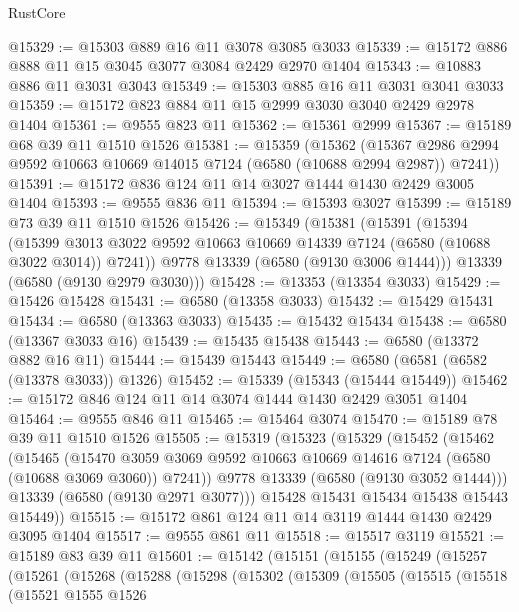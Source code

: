 \begin{lexlean}{RustCore}
\begin{coremodule}
{\begin{coremodule}
{{{{{{{{{{{{{{{{{{{{{{{{{{{{{{{{{{{{{{{{{{{{{@15329 := @15303 @889 @16 @11 @3078 @3085 @3033
@15339 := @15172 @886 @888 @11 @15 @3045 @3077 @3084 @2429 @2970 @1404
@15343 := @10883 @886 @11 @3031 @3043
@15349 := @15303 @885 @16 @11 @3031 @3041 @3033
@15359 := @15172 @823 @884 @11 @15 @2999 @3030 @3040 @2429 @2978 @1404
@15361 := @9555 @823 @11
@15362 := @15361 @2999
@15367 := @15189 @68 @39 @11 @1510 @1526
@15381 := @15359
    (@15362
      (@15367 @2986 @2994 @9592 @10663 @10669 @14015 @7124 (@6580 (@10688 @2994 @2987)) @7241))
@15391 := @15172 @836 @124 @11 @14 @3027 @1444 @1430 @2429 @3005 @1404
@15393 := @9555 @836 @11
@15394 := @15393 @3027
@15399 := @15189 @73 @39 @11 @1510 @1526
@15426 := @15349
    (@15381
      (@15391
        (@15394
          (@15399 @3013 @3022 @9592 @10663 @10669 @14339 @7124 (@6580 (@10688 @3022 @3014)) @7241))
        @9778
        @13339
        (@6580 (@9130 @3006 @1444)))
      @13339
      (@6580 (@9130 @2979 @3030)))
@15428 := @13353 (@13354 @3033)
@15429 := @15426 @15428
@15431 := @6580 (@13358 @3033)
@15432 := @15429 @15431
@15434 := @6580 (@13363 @3033)
@15435 := @15432 @15434
@15438 := @6580 (@13367 @3033 @16)
@15439 := @15435 @15438
@15443 := @6580 (@13372 @882 @16 @11)
@15444 := @15439 @15443
@15449 := @6580 (@6581 (@6582 (@13378 @3033)) @1326)
@15452 := @15339 (@15343 (@15444 @15449))
@15462 := @15172 @846 @124 @11 @14 @3074 @1444 @1430 @2429 @3051 @1404
@15464 := @9555 @846 @11
@15465 := @15464 @3074
@15470 := @15189 @78 @39 @11 @1510 @1526
@15505 := @15319
    (@15323
      (@15329
        (@15452
          (@15462
            (@15465
              (@15470
                @3059
                @3069
                @9592
                @10663
                @10669
                @14616
                @7124
                (@6580 (@10688 @3069 @3060))
                @7241))
            @9778
            @13339
            (@6580 (@9130 @3052 @1444)))
          @13339
          (@6580 (@9130 @2971 @3077)))
        @15428
        @15431
        @15434
        @15438
        @15443
        @15449))
@15515 := @15172 @861 @124 @11 @14 @3119 @1444 @1430 @2429 @3095 @1404
@15517 := @9555 @861 @11
@15518 := @15517 @3119
@15521 := @15189 @83 @39 @11
@15601 := @15142
    (@15151
      (@15155
        (@15249
          (@15257
            (@15261
              (@15268
                (@15288
                  (@15298
                    (@15302
                      (@15309
                        (@15505
                          (@15515
                            (@15518
                              (@15521
                                @1555
                                @1526
}}}}}}}}}}}}}}}}}}}}}}}}}}}}}}}}}}}}}}}}}}}}}
\end{coremodule}}
\end{coremodule}
\end{lexlean}

